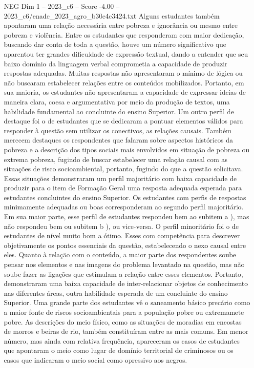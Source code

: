 \begin{textsample}{NEG Dim 1 – 2023\_c6 – Score -4.00 – 2023\_c6/enade\_2023\_agro\_b30e4e3424.txt}
Alguns estudantes também apontaram uma relação necessária entre pobreza e ignorância ou mesmo entre pobreza e violência.
Entre os estudantes que responderam com maior dedicação, buscando dar conta de toda a questão, houve um número significativo que aparentou ter grandes dificuldade de expressão textual, dando a entender que seu baixo domínio da linguagem verbal comprometia a capacidade de produzir respostas adequadas.
Muitas respostas não apresentaram o mínimo de lógica ou não buscaram estabelecer relações entre os conteúdos mobilizados.
Portanto, em sua maioria, os estudantes não apresentaram a capacidade de expressar ideias de maneira clara, coesa e argumentativa por meio da produção de textos, uma habilidade fundamental ao concluinte do ensino Superior.
Um outro perfil de destaque foi o de estudantes que se dedicaram a pontuar elementos válidos para responder à questão sem utilizar os conectivos, as relações causais.
Também merecem destaques os respondentes que falaram sobre aspectos históricos da pobreza e a descrição dos tipos sociais mais envolvidos em situação de pobreza ou extrema pobreza, fugindo de buscar estabelecer uma relação causal com as situações de risco socioambiental, portanto, fugindo do que a questão solicitava.
Essas situações demonstraram um perfil majoritário com baixa capacidade de produzir para o item de Formação Geral uma resposta adequada esperada para estudantes concluintes do ensino Superior.
Os estudantes com perfis de respostas minimamente adequadas ou boas corresponderam ao segundo perfil majoritário.
Em sua maior parte, esse perfil de estudantes respondeu bem ao subitem a ), mas não respondeu bem ou subitem b ), ou vice-versa.
O perfil minoritário foi o de estudantes de nível muito bom a ótimo.
Esses com competência para descrever objetivamente os pontos essenciais da questão, estabelecendo o nexo causal entre eles.
Quanto à relação com o conteúdo, a maior parte dos respondentes soube pensar nos elementos e nas imagens do problema levantado na questão, mas não soube fazer as ligações que estimulam a relação entre esses elementos.
Portanto, demonstraram uma baixa capacidade de inter-relacionar objetos de conhecimento nas diferentes áreas, outra habilidade esperada de um concluinte do ensino Superior.
Uma grande parte dos estudantes vê o saneamento básico precário como a maior fonte de riscos socioambientais para a população pobre ou extremamete pobre.
As descrições do meio físico, como as situações de moradias em encostas de morros e beiras de rio, também constituíram entre as mais comuns.
Em menor número, mas ainda com relativa frequência, apareceram os casos de estudantes que apontaram o meio como lugar de domínio territorial de criminosos ou os casos que indicaram o meio social como opressivo aos negros.

\end{textsample}
